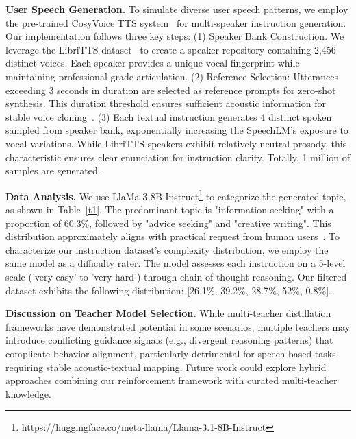 \documentclass[letterpaper]{article} %
\begin{document}
\noindent \textbf{User Speech Generation.} To simulate diverse user speech patterns, we employ the pre-trained CosyVoice TTS system~\cite{du2024cosyvoice} for multi-speaker instruction generation. Our implementation follows three key steps: (1) Speaker Bank Construction.
We leverage the LibriTTS dataset~\cite{zen2019libritts} to create a speaker repository containing 2,456 distinct voices. Each speaker provides a unique vocal fingerprint while maintaining professional-grade articulation. (2) Reference Selection: Utterances exceeding 3 seconds in duration are selected as reference prompts for zero-shot synthesis. This duration threshold ensures sufficient acoustic information for stable voice cloning~\cite{wang2023neural}. (3) Each textual instruction generates 4 distinct spoken sampled from speaker bank, exponentially increasing the SpeechLM's exposure to vocal variations. While LibriTTS speakers exhibit relatively neutral prosody, this characteristic ensures clear enunciation for instruction clarity. Totally, 1 million of samples are generated. \par
\noindent \textbf{Data Analysis.} We use LlaMa-3-8B-Instruct\footnote{https://huggingface.co/meta-llama/Llama-3.1-8B-Instruct} to categorize the generated topic, as shown in Table~\ref{t1}. The predominant topic is "information seeking" with a proportion of 60.3\%, followed by "advice seeking" and "creative writing". This distribution approximately aligns with practical request from human users~\cite{li2023alpacaeval}. To characterize our instruction dataset's complexity distribution, we employ the same model as a difficulty rater. The model assesses each instruction on a 5-level scale ('very easy' to 'very hard') through chain-of-thought reasoning. Our filtered dataset exhibits the following distribution: [26.1\%, 39.2\%, 28.7\%, 52\%, 0.8\%].\par
\noindent \textbf{Discussion on Teacher Model Selection.} While multi-teacher distillation frameworks have demonstrated potential in some scenarios, multiple teachers may introduce conflicting guidance signals (e.g., divergent reasoning patterns) that complicate behavior alignment, particularly detrimental for speech-based tasks requiring stable acoustic-textual mapping. Future work could explore hybrid approaches combining our reinforcement framework with curated multi-teacher knowledge.
\end{document}
